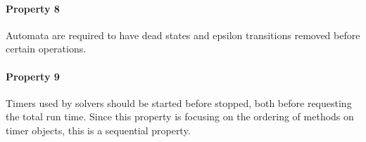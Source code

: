 \documentclass[letterpaper,11pt,twocolumn]{article}
\begin{document}
\paragraph{Property 8} Automata are required to have dead states and epsilon
transitions removed before certain operations.

\paragraph{Property 9} Timers used by solvers should be started before stopped,
both before requesting the total run time.  Since this property is focusing on
the ordering of methods on timer objects, this is a sequential property.

\nocite{*}


\end{document}
